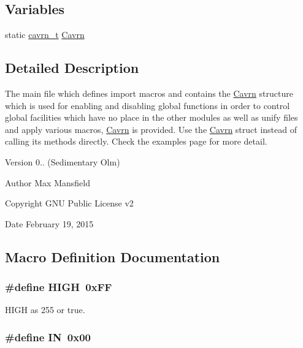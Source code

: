 \subsection*{Variables}
\begin{DoxyCompactItemize}
\item 
static \hyperlink{a00006}{cavrn\-\_\-t} \hyperlink{a00011_a1790b0cf365be58885af424fb01ecd50}{Cavrn}
\end{DoxyCompactItemize}


\subsection{Detailed Description}
The main file which defines import macros and contains the \hyperlink{a00005}{Cavrn} structure which is used for enabling and disabling global functions in order to control global facilities which have no place in the other modules as well as unify files and apply various macros, \hyperlink{a00005}{Cavrn} is provided. Use the \hyperlink{a00005}{Cavrn} struct instead of calling its methods directly. Check the examples page for more detail. \begin{DoxyVersion}{Version}
0.. (Sedimentary Olm) 
\end{DoxyVersion}
\begin{DoxyAuthor}{Author}
Max Mansfield 
\end{DoxyAuthor}
\begin{DoxyCopyright}{Copyright}
G\-N\-U Public License v2 
\end{DoxyCopyright}
\begin{DoxyDate}{Date}
February 19, 2015 
\end{DoxyDate}


\subsection{Macro Definition Documentation}
\hypertarget{a00011_a5bb885982ff66a2e0a0a45a8ee9c35e2}{
\subsubsection[{H\-I\-G\-H}]{\setlength{\rightskip}{0pt plus 5cm}\#define H\-I\-G\-H~0x\-F\-F}}\label{a00011_a5bb885982ff66a2e0a0a45a8ee9c35e2}


H\-I\-G\-H as 255 or true. 

\hypertarget{a00011_ac2bbd6d630a06a980d9a92ddb9a49928}{
\subsubsection[{I\-N}]{\setlength{\rightskip}{0pt plus 5cm}\#define I\-N~0x00}}\label{a00011_ac2bbd6d630a06a980d9a92ddb9a49928}


